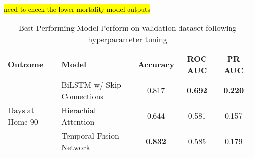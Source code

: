 \documentclass{article}
\begin{document}
\hl{need to check the lower mortality model outputs}
\begin{table}[htbp]
    \centering
    \caption{Best Performing Model Perform on validation dataset following hyperparameter tuning}
    \begin{tabular}{llccc}
        \hline
        Outcome                                 & Model                      & Accuracy       & ROC AUC        & PR AUC          \\
        \hline
        \multirow{5}{*}{Days at Home 90}        & BiLSTM w/ Skip Connections & 0.817          & \textbf{0.692} & \textbf{0.220}  \\
                                                & Hierachial Attention       & 0.644          & 0.581          & 0.157           \\
                                                & Temporal Fusion Network    & \textbf{0.832} & 0.585          & 0.179           \\


\end{tabular}
\end{table}
\end{document}
